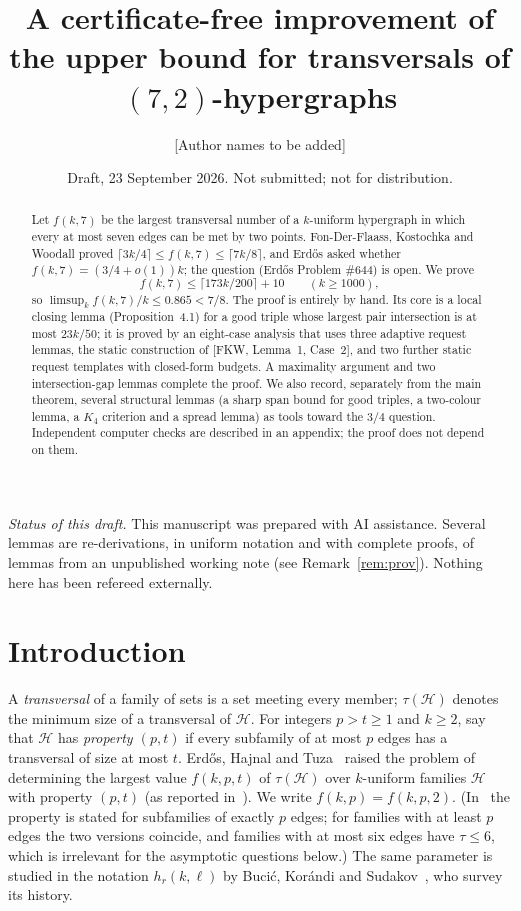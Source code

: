 \documentclass[11pt]{amsart}
\title[A certificate-free bound for $f(k,7)$]{A certificate-free improvement of the upper bound for transversals of $(7,2)$-hypergraphs}
\author{[Author names to be added]}
\date{Draft, 23 September 2026. Not submitted; not for distribution.}
\theoremstyle{definition}
\theoremstyle{remark}
\newcommand{\cH}{\mathcal H}
\newcommand{\ceil}[1]{\lceil #1\rceil}
\begin{document}
\begin{abstract}
Let $f(k,7)$ be the largest transversal number of a $k$-uniform hypergraph in which every at most seven edges can be met by two points. Fon-Der-Flaass, Kostochka and Woodall proved $\ceil{3k/4}\le f(k,7)\le\ceil{7k/8}$, and Erd\H{o}s asked whether $f(k,7)=(3/4+o(1))k$; the question (Erd\H{o}s Problem \#644) is open. We prove
\[
f(k,7)\le\ceil{173k/200}+10\qquad(k\ge1000),
\]
so $\limsup_k f(k,7)/k\le 0.865<7/8$. The proof is entirely by hand. Its core is a local closing lemma (Proposition~4.1) for a good triple whose largest pair intersection is at most $23k/50$; it is proved by an eight-case analysis that uses three adaptive request lemmas, the static construction of [FKW, Lemma~1, Case~2], and two further static request templates with closed-form budgets. A maximality argument and two intersection-gap lemmas complete the proof. We also record, separately from the main theorem, several structural lemmas (a sharp span bound for good triples, a two-colour lemma, a $K_4$ criterion and a spread lemma) as tools toward the $3/4$ question. Independent computer checks are described in an appendix; the proof does not depend on them.
\end{abstract}
\maketitle

\noindent\textit{Status of this draft.} This manuscript was prepared with AI assistance. Several lemmas are re-derivations, in uniform notation and with complete proofs, of lemmas from an unpublished working note (see Remark~\ref{rem:prov}). Nothing here has been refereed externally.

\section{Introduction}

A \emph{transversal} of a family of sets is a set meeting every member; $\tau(\cH)$ denotes the minimum size of a transversal of $\cH$. For integers $p>t\ge1$ and $k\ge2$, say that $\cH$ has \emph{property $(p,t)$} if every subfamily of at most $p$ edges has a transversal of size at most $t$. Erd\H{o}s, Hajnal and Tuza~\cite{EHT} raised the problem of determining the largest value $f(k,p,t)$ of $\tau(\cH)$ over $k$-uniform families $\cH$ with property $(p,t)$ (as reported in~\cite{FKW}). We write $f(k,p)=f(k,p,2)$. (In~\cite{FKW} the property is stated for subfamilies of exactly $p$ edges; for families with at least $p$ edges the two versions coincide, and families with at most six edges have $\tau\le6$, which is irrelevant for the asymptotic questions below.) The same parameter is studied in the notation $h_r(k,\ell)$ by Buci\'c, Kor\'andi and Sudakov~\cite{BKS}, who survey its history.
\end{document}
